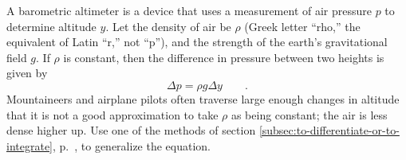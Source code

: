 A barometric altimeter is a device that uses a measurement of air pressure $p$ to determine
altitude $y$. Let the density of air be $\rho$ (Greek letter ``rho,'' the equivalent of Latin ``r,'' not
``p''), and the strength of the earth's gravitational field $g$. If $\rho$ is constant, then the
difference in pressure between two heights is given by
\begin{equation*}
  \Delta p = \rho g \Delta y \qquad .
\end{equation*}
Mountaineers and airplane pilots often traverse large enough changes in altitude that it is not
a good approximation to take $\rho$ as being constant; the air is less dense higher up.
Use one of the methods of section \ref{subsec:to-differentiate-or-to-integrate},
p.~\pageref{subsec:to-differentiate-or-to-integrate}, to generalize the equation.
